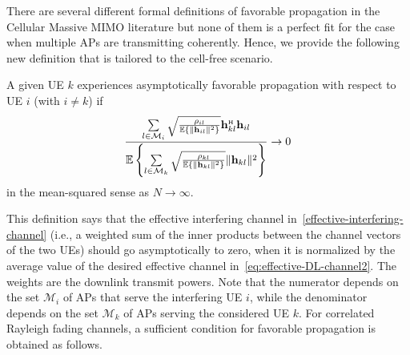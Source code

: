 There are several different formal definitions of favorable propagation in the Cellular Massive MIMO literature but none of them is a perfect fit for the case when multiple APs are transmitting coherently. Hence, we provide the following new definition that is tailored to the cell-free scenario.

\begin{definition}\label{def:favorable-propagation-new} 
A given UE $k$ experiences asymptotically favorable propagation with respect to UE $i$ (with $i \neq k$) if
	\begin{equation} \label{eq:asympt-favorable-new}
	\frac{ \sum\limits_{l \in \mathcal{M}_i}   \sqrt{\frac{\rho_{il}}{\mathbb{E} \{\| \vect{h}_{il} \|^2 \}} } \vect{h}_{kl}^{\Htran}  \vect{h}_{il} }{ \mathbb{E} \left\{ \sum\limits_{l \in \mathcal{M}_k} \sqrt{\frac{\rho_{kl}}{\mathbb{E} \{\| \vect{h}_{kl} \|^2 \}} } \| \vect{h}_{kl} \|^2  \right\} } \rightarrow 0
	\end{equation}
	in the mean-squared sense as  $N  \rightarrow \infty$.
\end{definition}

This definition says that the effective interfering channel in~\eqref{effective-interfering-channel} (i.e., a weighted sum of the inner products between the channel vectors of the two UEs) should go asymptotically to zero, when it is normalized by the average value of the desired effective channel in~\eqref{eq:effective-DL-channel2}. The weights are the downlink transmit powers.
Note that the numerator depends on the set $\mathcal{M}_i$ of APs that serve the interfering UE $i$, while the denominator depends on the set $\mathcal{M}_k$ of APs serving the considered UE $k$. For correlated Rayleigh fading channels, a sufficient condition for favorable propagation is obtained as follows.

